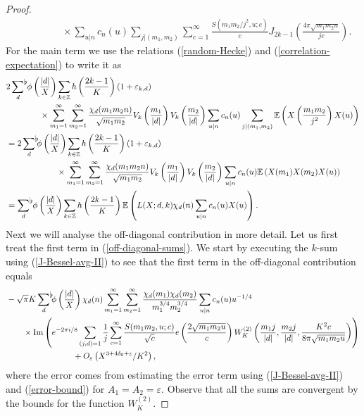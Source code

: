 \documentclass[a4paper,10pt,twoside]{amsart}
\theoremstyle{definition}
\numberwithin{equation}{section}
\newcommand\Z{\mathbb{Z}}
\newcommand\eps{\varepsilon}
\renewcommand{\Im}{\textnormal{Im}}
\renewcommand\:{\colon}
\newcommand{\sumflat}{\mathop{{\sum}^{\raisebox{-3pt}{\makebox[0pt][l]{$\flat$}}}}}
\begin{document}
\begin{proof}
\begin{align}
&\qquad\qquad\times\sum_{u|n}c_n(u)\sum_{j|(m_1,m_2)}\sum_{c=1}^\infty\frac{S(m_1m_2/j^2,u;c)}{c}J_{2k-1}\left(\frac{4\pi\sqrt{m_1m_2u}}{jc}\right). \nonumber
\end{align}
For the main term we use the relations (\ref{random-Hecke}) and (\ref{correlation-expectation}) to write it as 
\begin{align*}
& 2\sumflat_{d}\,\phi\left(\frac{|d|}X\right)\sum_{k\in\Z}h\left(\frac{2k-1}K\right)(1+\varepsilon_{k,d})\\
&\qquad\qquad\times\sum_{m_1=1}^\infty\sum_{m_2=1}^\infty \frac{\chi_d(m_1m_2n)}{\sqrt{m_1m_2}}V_k\left(\frac{m_1}{|d|}\right)V_k\left(\frac {m_2}{|d|}\right)\sum_{u|n}c_n(u)\sum_{j|(m_1,m_2)}\mathbb E\left(X\left(\frac{m_1m_2}{j^2}\right)X(u)\right)\\
&=2\sumflat_{d}\phi\left(\frac{|d|}X\right)\sum_{k\in\Z}h\left(\frac{2k-1}K\right)(1+\varepsilon_{k,d})\\
&\qquad\qquad\qquad\times\sum_{m_1=1}^\infty\sum_{m_2=1}^\infty \frac{\chi_d(m_1m_2n)}{\sqrt{m_1m_2}}V_k\left(\frac{m_1}{|d|}\right)V_k\left(\frac {m_2}{|d|}\right)\sum_{u|n}c_n(u)\mathbb E\left(X(m_1)X(m_2)X(u)\right)\\
&=\sumflat_{d}\,\phi\left(\frac{|d|}X\right)\sum_{k\in\Z}h\left(\frac{2k-1}K\right)\mathbb E\left(L(X;d,k)\chi_d(n)\sum_{u|n}c_n(u) X(u)\right).
\end{align*}
Next we will analyse the off-diagonal contribution in more detail. Let us first treat the first term in (\ref{off-diagonal-sums}). We start by executing the $k$-sum using (\ref{J-Bessel-avg-II}) to see that the first term in the off-diagonal contribution equals
\begin{align}\label{after-k-sum}
&-\sqrt\pi K\sumflat_d\phi\left(\frac{|d|}X\right)\chi_d(n)\sum_{m_1=1}^\infty\sum_{m_2=1}^\infty\frac{\chi_d(m_1)\chi_d(m_2)}{m_1^{3/4}m_2^{3/4}}\sum_{u|n}c_n(u)u^{-1/4} \nonumber\\
&\qquad\times\Im\left(e^{-2\pi i/8}\sum_{(j,d)=1}\frac1{j}\sum_{c=1}^\infty\frac{S(m_1m_2,u;c)}{\sqrt c} e\left(\frac{2\sqrt{m_1m_2u}}{c}\right)W_K^{(2)}\left(\frac{m_1j}{|d|},\frac {m_2j}{|d|},\frac{K^2c}{8\pi\sqrt{m_1m_2u}}\right)\right)\\
&\qquad\qquad\qquad\qquad+O_\eps\left(X^{3+4\delta_0+\eps}/K^2\right), \nonumber
\end{align}
where the error comes from estimating the error term using (\ref{J-Bessel-avg-II}) and (\ref{error-bound}) for $A_1=A_2=\varepsilon$. Observe that all the sums are convergent by the bounds for the function $W_K^{(2)}$.


\end{proof}
\end{document}
